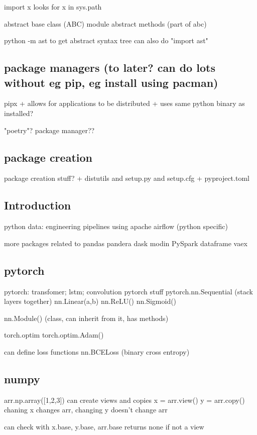import x looks for x in sys.path

abstract base class (ABC) module
abstract methods (part of abc)

python -m ast to get abstract syntax tree
can also do "import ast"
\subsection{package managers (to later? can do lots without eg pip, eg install using pacman)}
pipx
+ allows for applications to be distributed
+ uses same python binary as installed?

"poetry"? package manager??
\subsection{package creation}

package creation stuff?
+ distutils and setup.py and setup.cfg
+ pyproject.toml



\subsection{Introduction}

python data: engineering pipelines using apache airflow (python specific)





more packages related to pandas
pandera
dask
modin
PySpark dataframe
vaex

\subsection{pytorch}
pytorch: transfomer; lstm; convolution
pytorch stuff
pytorch.nn.Sequential (stack layers together)
nn.Linear(a,b)
nn.ReLU()
nn.Sigmoid()

nn.Module() (class, can inherit from it, has methods)

torch.optim
torch.optim.Adam()

can define loss functions
nn.BCELoss (binary cross entropy)
\subsection{numpy}
arr.np.array([1,2,3])
can create views and copies
x = arr.view()
y = arr.copy()
chaning x changes arr, changing y doesn't change arr

can check with x.base, y.base, arr.base
returns none if not a view

